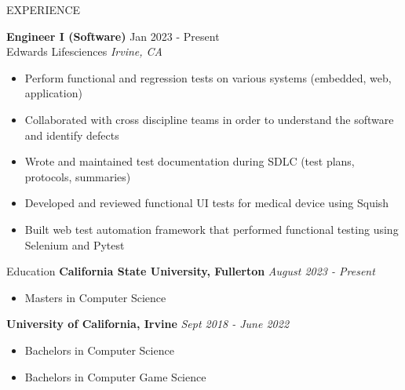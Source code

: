 \documentclass{ResumeFormat} %
\begin{document}
\begin{rSection}{EXPERIENCE}

\textbf{Engineer I (Software)} \hfill Jan 2023 - Present\\
Edwards Lifesciences \hfill \textit{Irvine, CA}
 \begin{itemize}
    \itemsep -3pt {} 
        \item Perform functional and regression tests on various systems (embedded, web, application)
        \item Collaborated with cross discipline teams in order to understand the software and identify defects
        \item Wrote and maintained test documentation during SDLC (test plans, protocols, summaries)
        \item Developed and reviewed functional UI tests for medical device using Squish
        \item Built web test automation framework that performed functional testing using Selenium and Pytest
 \end{itemize}

\end{rSection} 

\begin{rSection}{Education}
{\bf California State University, Fullerton \hfill} {\emph{August 2023 - Present}}
\begin{itemize}
    \itemsep -3pt {} 
        \item Masters in Computer Science
 \end{itemize}
{\bf University of California, Irvine \hfill} {\emph{Sept 2018 - June 2022}}
\begin{itemize}
    \itemsep -3pt {} 
        \item Bachelors in Computer Science
        \item Bachelors in Computer Game Science
 \end{itemize}


\end{rSection}
\end{document}
